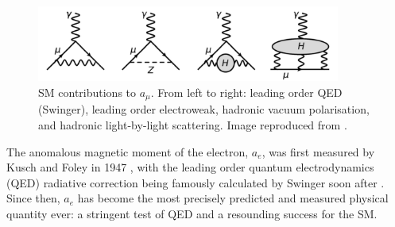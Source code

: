 \begin{figure}[b!]
\centering{}
\includegraphics[trim={0 0 0 0},clip,width=0.89\textwidth]{Images/Chapter1/FeynmanDiagrams.pdf}
\caption{SM contributions to $a_{\mu}$. From left to right: leading order QED (Swinger), leading order electroweak, hadronic vacuum polarisation, and hadronic light-by-light scattering. Image reproduced from \cite{SummaryRun1}.}
\label{fig:SMContributions}
\end{figure}

The anomalous magnetic moment of the electron, $a_{e}$, was first measured by Kusch and Foley in 1947 \cite{KuschAndFoley}, with the leading order quantum electrodynamics (QED) radiative correction being famously calculated by Swinger soon after \cite{Swinger}. Since then, $a_{e}$ has become the most precisely predicted \cite{ElectronAnomalyPrediction} and measured \cite{ElectronAnomalyMeasurement} physical quantity ever: a stringent test of QED and a resounding success for the SM.

